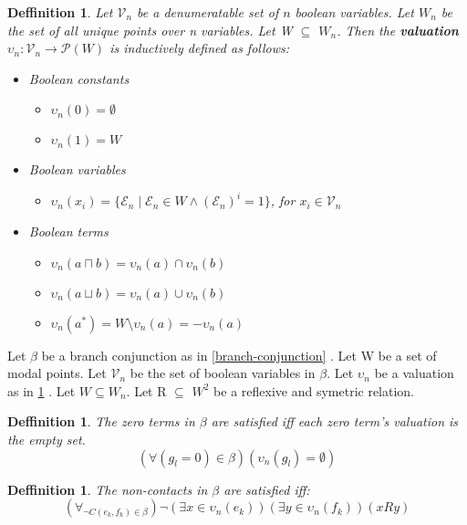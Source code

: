 \documentclass{article}
\newcommand\p{\mathcal{P}}
\newcommand\V{\mathcal{V}}
\newcommand\E{\mathcal{E}}
\newtheorem{defn}[theorem]{Deffinition}
\begin{document}
		\begin{defn}
			\label{valuation-modal-points}
			Let $\V_n$ be a denumeratable set of $n$ boolean variables. Let $W_n$ be the set of all unique points over n variables. Let W $\subseteq$ $W_n$. Then the \textbf{valuation $\upsilon_n : \V_n \rightarrow \p(W)$} is inductively defined as follows:
			\begin{itemize}
				\item Boolean constants
					\begin{itemize}
						\item $\upsilon_n(0) = \emptyset$
						\item $\upsilon_n(1) = W$
					\end{itemize}
				\item Boolean variables
					\begin{itemize}
						\item $\upsilon_n(x_i) = \{ \E_n \mid \E_n \in W \land (\E_n)^i = 1 \}$, for $x_i \in \V_n$
					\end{itemize}
				\item Boolean terms
					\begin{itemize}
						\item $\upsilon_n(a \sqcap b) = \upsilon_n(a) \cap \upsilon_n(b)$
						\item $\upsilon_n(a \sqcup b) = \upsilon_n(a) \cup \upsilon_n(b)$
						\item $\upsilon_n(a^*) = W \setminus \upsilon_n(a) = -\upsilon_n(a)$
					\end{itemize}
			\end{itemize}
		\end{defn}

		Let $\beta$ be a branch conjunction as in \ref{branch-conjunction} . Let W be a set of modal points. Let $\V_n$ be the set of boolean variables in $\beta$. Let $\upsilon_n$ be a valuation as in \ref{valuation-modal-points} . Let $W \subseteq W_n$. Let R $\subseteq$ $W^2$ be a reflexive and symetric relation.

		\begin{defn}
			The zero terms in $\beta$ are satisfied iff each zero term's valuation is the empty set.
			\begin{equation}
				(\forall (g_l = 0) \in \beta)(\upsilon_n(g_l) = \emptyset)
			\end{equation}
		\end{defn}

		\begin{defn}
			The non-contacts in $\beta$ are satisfied iff:
			\begin{equation}
				(\forall_{\neg C(e_k, f_k) \in \beta})\neg(\exists x \in \upsilon_n(e_k))(\exists y \in \upsilon_n(f_k))(xRy)
			\end{equation}
		\end{defn}
\end{document}
